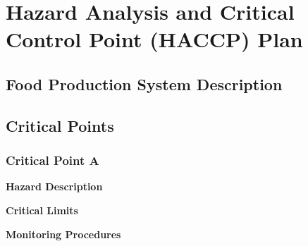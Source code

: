 \section{Hazard Analysis and Critical Control Point (HACCP) Plan}

\subsection{Food Production System Description}


\subsection{Critical Points}







\subsubsection{Critical Point A}
\textbf{Hazard Description}

\textbf{Critical Limits}

\textbf{Monitoring Procedures}

